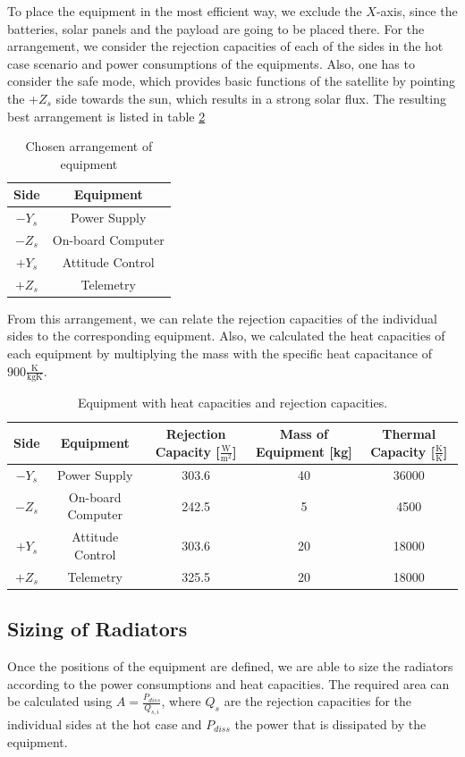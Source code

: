 To place the equipment in the most efficient way, we exclude the $X$-axis, since the batteries, solar panels and the payload are going to be placed there. For the arrangement, we consider the rejection capacities of each of the sides in the hot case scenario and power consumptions of the equipments. Also, one has to consider the safe mode, which provides basic functions of the satellite by pointing the +$Z_{s}$ side towards the sun, which results in a strong solar flux. The resulting best arrangement is listed in table \ref{tab:arrangement}

\begin{table}[H]
\centering
\begin{tabular}{ | c| c|}
\hline 
Side & Equipment  \\ \hline
$-Y_{s}$ & Power Supply  \\ \hline
$-Z_{s}$ &On-board Computer \\\hline
$+Y_{s}$ &Attitude Control \\ \hline
$+Z_{s}$ &Telemetry   \\ \hline
\end{tabular}
\caption{Chosen arrangement of equipment}
\label{tab:arrangement}
\end{table}
From this arrangement, we can relate the rejection capacities of the individual sides to the corresponding equipment. Also, we calculated the heat capacities of each equipment by multiplying the mass with the specific heat capacitance of $900\frac{\mathrm{K}}{\mathrm{kgK}}$.


\begin{table}[H]
\centering
\begin{tabular}{ | c| c|c|c|c|}
\hline 
Side & Equipment  & Rejection Capacity [$\frac{\mathrm{W}}{\mathrm{m}^{2}} $] &Mass of Equipment [kg] & Thermal Capacity [$\frac{\mathrm{K}}{\mathrm{K}}$]   \\ \hline
$-Y_{s}$ & Power Supply & 303.6 & 40 &  36000   \\ \hline
$-Z_{s}$ &On-board Computer&  242.5 & 5 & 4500 \\\hline
$+Y_{s}$ &Attitude Control  &  303.6 & 20& 18000 \\ \hline
$+Z_{s}$ &Telemetry & 325.5 & 20 &  18000 \\ \hline
\end{tabular}
\caption{Equipment with heat capacities and rejection capacities.}
\label{tab:arrangement}
\end{table} 

\subsection{Sizing of Radiators}
Once  the positions of the equipment are defined, we are able to size the radiators according to the power consumptions and heat capacities. The required area can be calculated using $A=\frac{P_{diss}}{Q_{s,i}}$, where $Q_{s}$ are the rejection capacities for the individual sides at the hot case and $P_{diss}$ the power that is dissipated by the equipment.


